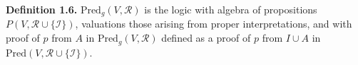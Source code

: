 \textbf{Definition 1.6.} $\text{Pred}_g(V, \mathcal{R})$ is the logic with algebra of propositions $P(V, \mathcal{R} \cup \{\mathcal{I}\})$, valuations those arising from proper interpretations, and with proof of $p$ from $A$ in $\text{Pred}_g(V, \mathcal{R})$ defined as a proof of $p$ from $I \cup A$ in $\text{Pred}(V, \mathcal{R} \cup \{\mathcal{I}\})$.

